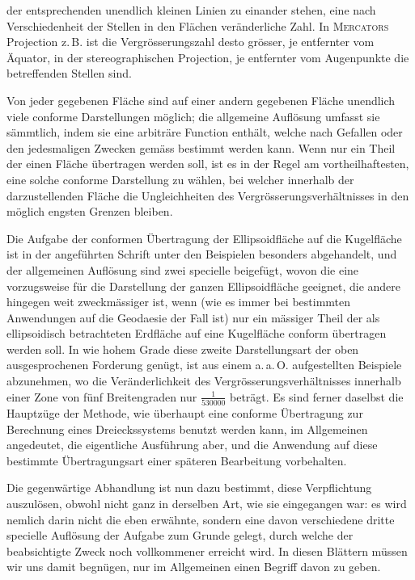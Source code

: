 %
der entsprechenden unendlich kleinen Linien zu einander stehen, eine nach Verschiedenheit der Stellen in den Flächen veränderliche Zahl. In \textsc{Mercators} Projection z.\,B. ist die Vergrösserungszahl desto grösser, je entfernter vom Äquator, in der stereographischen Projection, je entfernter vom Augenpunkte die betreffenden Stellen sind.

Von jeder gegebenen Fläche sind auf einer andern gegebenen Fläche unendlich viele conforme Darstellungen möglich; die allgemeine Auflösung umfasst sie sämmtlich, indem sie eine arbiträre Function enthält, welche nach Gefallen oder den jedesmaligen Zwecken gemäss bestimmt werden kann. Wenn nur ein Theil der einen Fläche übertragen werden soll, ist es in der Regel am vortheilhaftesten, eine solche conforme Darstellung zu wählen, bei welcher innerhalb der darzustellenden Fläche die Ungleichheiten des Vergrösserungsverhältnisses in den möglich engsten Grenzen bleiben.

Die Aufgabe der conformen Übertragung der Ellipsoidfläche auf die Kugelfläche ist in der angeführten Schrift unter den Beispielen besonders abgehandelt, und der allgemeinen Auflösung sind zwei specielle beigefügt, wovon die eine vorzugsweise für die Darstellung der ganzen Ellipsoidfläche geeignet, die andere hingegen weit zweckmässiger ist, wenn (wie es immer bei bestimmten Anwendungen auf die Geodaesie der Fall ist) nur ein mässiger Theil der als ellipsoidisch betrachteten Erdfläche auf eine Kugelfläche conform übertragen werden soll. In wie hohem Grade diese zweite Darstellungsart der oben ausgesprochenen Forderung genügt, ist aus einem a.\,a.\,O. aufgestellten Beispiele abzunehmen, wo die Veränderlichkeit des Vergrösserungsverhältnisses innerhalb einer Zone von fünf Breitengraden nur \(\frac1{530000}\) beträgt. Es sind ferner daselbst die Hauptzüge der Methode, wie überhaupt eine conforme Übertragung zur Berechnung eines Dreieckssystems benutzt werden kann, im Allgemeinen angedeutet, die eigentliche Ausführung aber, und die Anwendung auf diese bestimmte Übertragungsart einer späteren Bearbeitung vorbehalten.

Die gegenwärtige Abhandlung ist nun dazu bestimmt, diese Verpflichtung auszulösen, obwohl nicht ganz in derselben Art, wie sie eingegangen war: es wird nemlich darin nicht die eben erwähnte, sondern eine davon verschiedene dritte specielle Auflösung der Aufgabe zum Grunde gelegt, durch welche der beabsichtigte Zweck noch vollkommener erreicht wird. In diesen Blättern müssen wir uns damit begnügen, nur im Allgemeinen einen Begriff davon zu geben.
